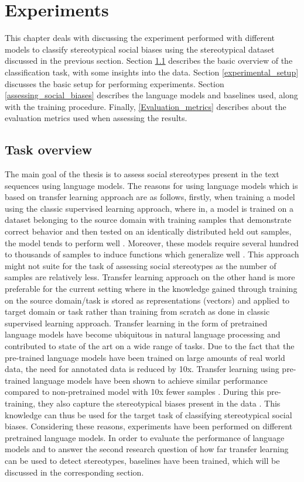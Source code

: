 \chapter{Experiments}

This chapter deals with discussing the experiment performed with different models to classify stereotypical social biases using the stereotypical dataset discussed in the previous section. Section \ref{task_overview} describes the basic overview of the classification task, with some insights into the data. Section \ref{experimental_setup}  discusses the basic setup for performing experiments. Section \ref{assessing_social_biases} describes the language models and baselines used, along with the training procedure. Finally, \ref{Evaluation_metrics} describes about the evaluation metrics used when assessing the results.

\section{ Task overview}\label{task_overview}
The main goal of the thesis is to assess social stereotypes present in the text sequences using language models. The reasons for using language models which is based on transfer learning approach are as follows, firstly, when training a model using the classic supervised learning approach, where in, a model is trained on a dataset belonging to the source domain with training samples that demonstrate correct behavior and then tested on an identically distributed held out samples, the model tends to perform well \cite{ruder2019neural}. Moreover, these models require several hundred to thousands of samples to induce functions which generalize well \cite{radford2019language}. This approach might not suite for the task of assessing social stereotypes as the number of samples are relatively less. Transfer learning approach on the other hand is more preferable for the current setting where in the knowledge gained through training on the source domain/task is stored as representations (vectors) and applied to target domain or task \cite{ruder2019neural} rather than training from scratch as done in classic supervised learning approach. Transfer learning in the form of pretrained language models have become ubiquitous in natural language processing and contributed to state of the art on a wide range of tasks\cite{ruder2019transfer}. Due to the fact that the pre-trained language models have been trained on large amounts of real world data, the need for annotated data is reduced by 10x. Transfer learning using pre-trained language models have been shown to achieve similar performance compared to non-pretrained model with 10x fewer samples \cite{howard2018universal}. During this pre-training, they also capture the stereotypical biases present in the data \cite{nadeem2020stereoset}. This knowledge can thus be used for the target task of classifying stereotypical social biases. Considering these reasons, experiments have been performed on different pretrained language models. In order to evaluate the performance of language models and to answer the second research question of how far transfer learning can be used to detect stereotypes, baselines have been trained, which will be discussed in the corresponding section.


